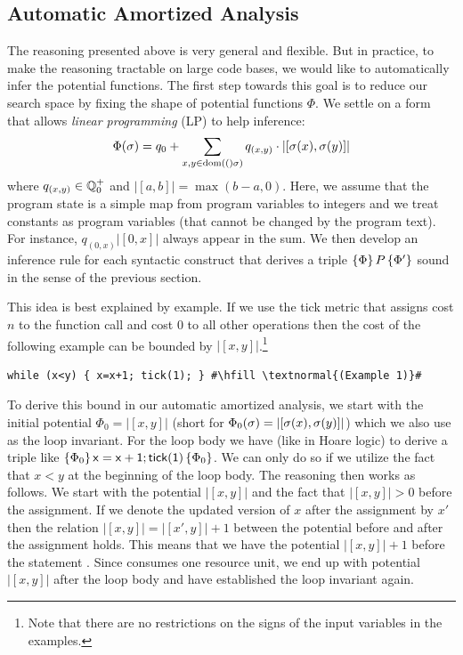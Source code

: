 \documentclass[nocopyrightspace,preprint,pldi]{sigplanconf-pldi15}
\begin{document}

\subsection{Automatic Amortized Analysis}

The reasoning presented above is very general and flexible.  But in
practice, to make the reasoning tractable on large code bases, we would
like to automatically infer the potential functions.  The first step
towards this goal is to reduce our search space by fixing the shape
of potential functions $\Phi$.  We settle on a form that allows
\emph{linear programming} (LP) to help inference:
%
%
$$
\Phi(\sigma) = q_0 + \sum_{x,y \in  \text{dom}(()\sigma)}
  q_{(x,y)} \cdot |[\sigma(x),\sigma(y)]|
$$
where $q_{(x,y)} \in \mathbb Q^+_0$ and $|[a,b]| = \max(b-a,0)$.  Here, we assume
that the program state is a simple map from program variables to integers
and we treat constants as program variables (that cannot be changed
by the program text).  For instance, $q_{(0,x)}|[0,x]|$ always appear in
the sum.  We then develop an inference rule for each syntactic construct
that derives a triple $\{\Phi\}\, P\, \{\Phi'\}$ sound in the sense of
the previous section.

This idea is best explained by example.  If we use the tick metric that
assigns cost $n$ to the function call  and cost $0$ to all
other operations then the cost of the following example can be bounded
by $|[x,y]|$.\footnote{Note that there are no restrictions on the signs
of the input variables in the examples.}
\begin{lstlisting}[basicstyle=\tt\small]
while (x<y) { x=x+1; tick(1); } #\hfill \textnormal{(Example 1)}#
\end{lstlisting}
To derive this bound in our automatic amortized analysis, we start with
the initial potential $\Phi_0 = |[x,y]|$ (short for $\Phi_0(\sigma)
= |[\sigma(x),\sigma(y)]|$) which we also use as the loop invariant.
For the loop body we have (like in Hoare logic) to derive a triple
like $\{\Phi_0\}\, \mathsf{x=x+1;tick(1)}\, \{\Phi_0\}$.  We can only do
so if we utilize the fact that $x<y$ at the beginning of the loop body.
The reasoning then works as follows. We start with the potential $|[x,y]|$
and the fact that $|[x,y]| > 0$ before the assignment.  If we denote the
updated version of $x$ after the assignment by $x'$ then the relation
$|[x,y]| = |[x',y]| + 1$ between the potential before and after the
assignment  holds.  This means that we have the potential
$|[x,y]| + 1$ before the statement .  Since 
consumes one resource unit, we end up with potential $|[x,y]|$ after
the loop body and have established the loop invariant again.
\end{document}
